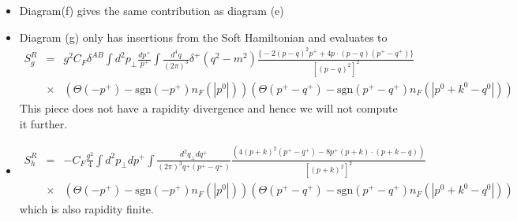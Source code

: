 \documentclass[letter,11pt]{article}
\newcommand{\nn}{\nonumber}
\newcommand{\bea}{\begin{eqnarray}}
\newcommand{\eea}{\end{eqnarray}}
\def\nn{\nonumber}
\begin{document}
\begin{itemize}
\item
Diagram(f) gives the same contribution as diagram (e)
\item
Diagram (g) only has insertions from the Soft Hamiltonian and evaluates to 
\bea
S_g^{R}&=& g^2C_F\delta^{AB}\int d^2p_{\perp}\frac{dp^+}{p^+} \int \frac{d^4q}{(2\pi)^3} \delta^+(q^2-m^2)\frac{\Big\{-2(p-q)^2p^+ +4p\cdot(p-q)(p^+-q^+)\Big\}}{[(p-q)^2]^2}\nn\\
&\times& \left( \Theta(-p^+)-\text{sgn}(-p^+)n_F(|p^0|)\right)\left(\Theta(p^+-q^+)-\text{sgn}(p^+-q^+)n_F(|p^0+k^0-q^0|)\right)
\eea
This piece does not have a rapidity divergence and hence we will not compute it further.

\item
\bea
S_{h}^R &=&-C_F\frac{g^2}{4}\int d^2p_{\perp}dp^+\int \frac{d^2q_{\perp}dq^+}{(2\pi)^3q^+(p^+-q^+)}\frac{\left(4(p+k)^2(p^+-q^+)-8p^+(p+k)\cdot(p+k-q)\right)}{[(p+k)^2]^2}\nn\\
&\times& \left( \Theta(-p^+)-\text{sgn}(-p^+)n_F(|p^0|)\right)\left(\Theta(p^+-q^+)-\text{sgn}(p^+-q^+)n_F(|p^0+k^0-q^0|)\right)
\eea
which is also rapidity finite.


\end{itemize}
\end{document}
